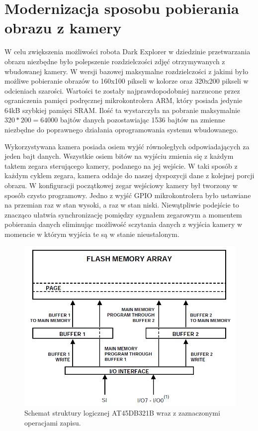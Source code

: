 \section{Modernizacja sposobu pobierania obrazu z kamery} 
\label{sec:img-acq}
W celu zwiększenia możliwości robota Dark Explorer w dziedzinie przetwarzania obrazu niezbędne było polepszenie rozdzielczości zdjęć otrzymywanych z wbudowanej kamery. W wersji bazowej maksymalne rozdzielczości z jakimi było możliwe pobieranie obrazów to 160x100 pikseli w kolorze oraz 320x200 pikseli w odcieniach szarości. Wartości te zostały najprawdopodobniej narzucone przez ograniczenia pamięci podręcznej mikrokontrolera ARM, który posiada jedynie 64kB szybkiej pamięci SRAM. Ilość ta wystarczyła na pobranie maksymalnie $320*200=64000$ bajtów danych pozostawiając 1536 bajtów na zmienne niezbędne do poprawnego działania oprogramowania systemu wbudowanego.

Wykorzystywana kamera posiada osiem wyjść równoległych odpowiadających za jeden bajt danych. Wszystkie osiem bitów na wyjściu zmienia się z każdym taktem zegara sterującego kamery, podanego na jej wejście. W taki sposób z każdym cyklem  zegara, kamera oddaje do naszej dyspozycji dane z kolejnej porcji obrazu. W konfiguracji początkowej zegar wejściowy kamery był tworzony w sposób czysto programowy. Jedno z wyjść GPIO mikrokontrolera było ustawiane na przemian raz w stan wysoki, a raz w stan niski. Niewątpliwie podejście to znacząco ułatwia synchronizację pomiędzy sygnałem zegarowym a momentem pobierania danych eliminując możliwość sczytania danych z wyjścia kamery w momencie w którym wyjścia te są w stanie nieustalonym.

\begin{figure}[ht!]
 \centering \includegraphics[height=85mm]{../images/ch04/dataflash_structure.png}
 \caption{Schemat struktury logicznej AT45DB321B wraz z zaznaczonymi operacjami zapisu\cite{AT45DB321BApplicationNote}.}
 \label{fig:DataFlashStruct}
\end{figure}

